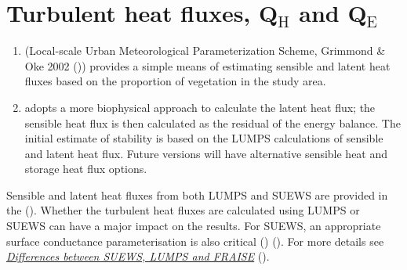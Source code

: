\documentclass[letterpaper,10pt,english]{sphinxmanual}
\begin{document}
\section{Turbulent heat fluxes, Q$_{\text{H}}$ and Q$_{\text{E}}$}
\label{\detokenize{parameterisations-and-sub-models:turbulent-heat-fluxes-qh-and-qe}}\begin{enumerate}
\item {} 
 (Local-scale Urban Meteorological Parameterization Scheme,
Grimmond \& Oke 2002 \label{\detokenize{parameterisations-and-sub-models:id13}}{\hyperref[\detokenize{references:go2002}]{\sphinxcrossref{{[}GO2002{]}}}} ()) provides a simple means of estimating
sensible and latent heat fluxes based on the proportion of vegetation
in the study area.

\item {} 
 adopts a more biophysical approach to calculate the latent
heat flux; the sensible heat flux is then calculated as the residual
of the energy balance. The initial estimate of stability is based on
the LUMPS calculations of sensible and latent heat flux. Future
versions will have alternative sensible heat and storage heat flux
options.

\end{enumerate}

Sensible and latent heat fluxes from both LUMPS and SUEWS are provided
in the {\hyperref[\detokenize{output_files/output_files:output-files}]{}} (). Whether the turbulent heat
fluxes are calculated using LUMPS or SUEWS can have a major impact on
the results. For SUEWS, an appropriate surface conductance
parameterisation is also critical \label{\detokenize{parameterisations-and-sub-models:id14}}{\hyperref[\detokenize{references:j11}]{\sphinxcrossref{{[}J11{]}}}} () \label{\detokenize{parameterisations-and-sub-models:id15}}{\hyperref[\detokenize{references:w16}]{\sphinxcrossref{{[}W16{]}}}} (). For more details see
{\hyperref[\detokenize{parameterisations-and-sub-models:Differences_between_SUEWS,_LUMPS_and_FRAISE}]{\emph{Differences between SUEWS, LUMPS and
FRAISE}}} ().
\end{document}
